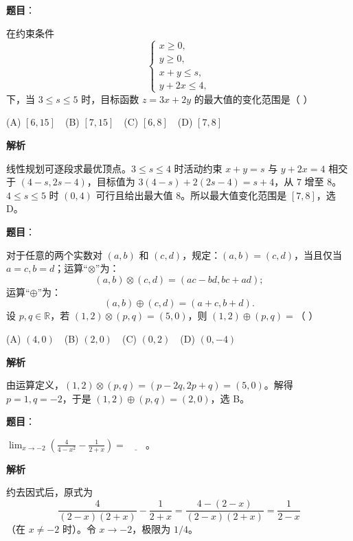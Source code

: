 \begin{answer}

\textbf{题目}：

在约束条件
\nopagebreak[4]
\[
\begin{cases}
x\geq 0,\\
y\geq 0,\\
x+y\leq s,\\
y+2x\leq 4,
\end{cases}
\]
下，当 \(3\leq s\leq5\) 时，目标函数 \(z=3x+2y\) 的最大值的变化范围是（  ）

(A) \([6,15]\)　(B) \([7,15]\)　(C) \([6,8]\)　(D) \([7,8]\)

\textbf{解析}

线性规划可逐段求最优顶点。$3\le s\le4$ 时活动约束 $x+y=s$ 与 $y+2x=4$ 相交于 $(4-s,2s-4)$，目标值为 $3(4-s)+2(2s-4)=s+4$，从 $7$ 增至 $8$。$4\le s\le5$ 时 $(0,4)$ 可行且给出最大值 $8$。所以最大值变化范围是 $[7,8]$，选 D。


\end{answer}
\begin{answer}

\textbf{题目}：

对于任意的两个实数对 \((a,b)\) 和 \((c,d)\)，规定：\((a,b)=(c,d)\)，当且仅当 \(a=c,b=d\)；运算“\(\otimes\)”为：
\nopagebreak[4]
\[
(a,b)\otimes(c,d)=(ac-bd,bc+ad);
\]
运算“\(\oplus\)”为：
\nopagebreak[4]
\[
(a,b)\oplus(c,d)=(a+c,b+d).
\]
设 \(p,q\in\mathbb R\)，若 \((1,2)\otimes(p,q)=(5,0)\)，则 \((1,2)\oplus(p,q)=\)（  ）

(A) \((4,0)\)　(B) \((2,0)\)　(C) \((0,2)\)　(D) \((0,-4)\)

\textbf{解析}

由运算定义，$(1,2)\otimes(p,q)=(p-2q,2p+q)=(5,0)$。解得 $p=1,q=-2$，于是 $(1,2)\oplus(p,q)=(2,0)$，选 B。


\end{answer}
\begin{answer}

\textbf{题目}：

\(\displaystyle\lim_{x\to-2}\left(\frac{4}{4-x^2}-\frac{1}{2+x}\right)=\underline{\qquad}\)。

\textbf{解析}

约去因式后，原式为
\nopagebreak[4]
\[
\frac{4}{(2-x)(2+x)}-\frac1{2+x}
=\frac{4-(2-x)}{(2-x)(2+x)}
=\frac1{2-x}
\]
（在 $x\ne-2$ 时）。令 $x\to-2$，极限为 $1/4$。


\end{answer}
